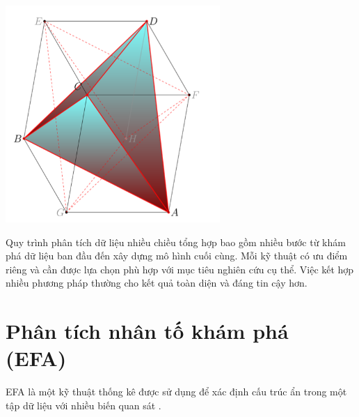 \noindent %
\begin{minipage}{0.4\textwidth} %
    \centering
    \includegraphics[width=\textwidth]{../../assets/images/figure-1.png} %
    \label{fig:multivariate_workflow}
\end{minipage}%
\hfill %
\begin{minipage}{0.55\textwidth} %
    Quy trình phân tích dữ liệu nhiều chiều tổng hợp bao gồm nhiều bước từ khám phá dữ liệu ban đầu đến xây dựng mô hình cuối cùng. Mỗi kỹ thuật có ưu điểm riêng và cần được lựa chọn phù hợp với mục tiêu nghiên cứu cụ thể. Việc kết hợp nhiều phương pháp thường cho kết quả toàn diện và đáng tin cậy hơn.
\end{minipage}

\section{Phân tích nhân tố khám phá (EFA)}

EFA là một kỹ thuật thống kê được sử dụng để xác định cấu trúc ẩn trong một tập dữ liệu với nhiều biến quan sát \cite{vu2022, hair2019, tabachnick2019}.

